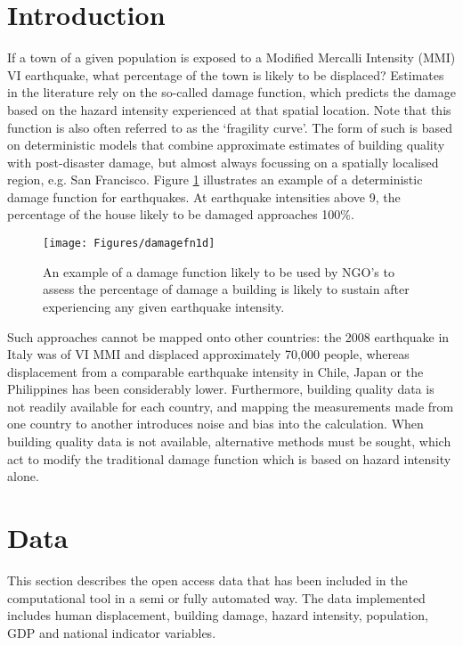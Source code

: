 \documentclass[10pt,a4paper]{article}
\begin{document}
\begin{multicols}{1}

\section{Introduction}\label{sec:intro}
If a town of a given population is exposed to a Modified Mercalli Intensity (MMI) VI earthquake, what percentage of the town is likely to be displaced? Estimates in the literature rely on the so-called damage function, which predicts the damage based on the hazard intensity experienced at that spatial location. Note that this function is also often referred to as the `fragility curve'. The form of such is based on deterministic models that combine approximate estimates of building quality with post-disaster damage, but almost always focussing on a spatially localised region, e.g. San Francisco. Figure \ref{fig:damagefn} illustrates an example of a deterministic damage function for earthquakes. At earthquake intensities above 9, the percentage of the house likely to be damaged approaches 100\%.
\begin{figure}[H]
  \texttt{[image: Figures/damagefn1d]}
 	\caption{An example of a damage function likely to be used by NGO's to assess the percentage of damage a building is likely to sustain after experiencing any given earthquake intensity.}
 	\label{fig:damagefn}
\end{figure}
  
Such approaches cannot be mapped onto other countries: the 2008 earthquake in Italy was of VI MMI and displaced approximately 70,000 people, whereas displacement from a comparable earthquake intensity in Chile, Japan or the Philippines has been considerably lower. Furthermore, building quality data is not readily available for each country, and mapping the measurements made from one country to another introduces noise and bias into the calculation. When building quality data is not available, alternative methods must be sought, which act to modify the traditional damage function which is based on hazard intensity alone.
\section{Data}\label{sec:data}
This section describes the open access data that has been included in the computational tool in a semi or fully automated way. The data implemented includes human displacement, building damage, hazard intensity, population, GDP and national indicator variables.

\end{multicols}
\end{document}
